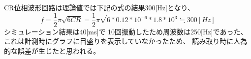 \documentclass{jsarticle}
\begin{document}
CR位相波形回路は理論値では下記の式の結果300[Hz]となり、
\[f=\frac{1}{2}\pi\sqrt{6CR}=\frac{1}{2}\pi\sqrt{6*0.12*10^{-6}*1.8*10^{3}}≒300[Hz]\]
シミュレーション結果は40[ms]で
10回振動したため周波数は250[Hz]であった、
これは計測時にグラフに目盛りを表示していなかったため、
読み取り時に人為的な誤差が生じたと思われる。


\end{document}
